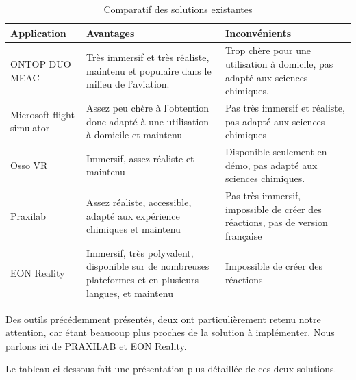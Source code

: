 \begin{table}[H]
	\centering
	\caption{Comparatif des solutions existantes}
	\begin{tabular}{|l|p{5cm}|p{5cm}|}
		\hline
		\textbf{Application}       & \textbf{Avantages}                                                                                       & \textbf{Inconvénients}                                                         \\ \hline
		ONTOP DUO MEAC             & Très immersif et très réaliste, maintenu et populaire dans le milieu de l'aviation.                      & Trop chère pour une utilisation à domicile, pas adapté aux sciences chimiques. \\ \hline
		Microsoft flight simulator & Assez peu chère à l'obtention donc adapté à une utilisation à domicile et maintenu                       & Pas très immersif et réaliste, pas adapté aux sciences chimiques               \\ \hline
		Osso VR                    & Immersif, assez réaliste et maintenu                                                                     & Disponible seulement en démo, pas adapté aux sciences chimiques.               \\ \hline
		Praxilab                   & Assez réaliste, accessible, adapté aux expérience chimiques et maintenu                                  & Pas très immersif, impossible de créer des réactions, pas de version française \\ \hline
		EON Reality                & Immersif, très polyvalent, disponible sur de nombreuses plateformes et en plusieurs langues, et maintenu & Impossible de créer des réactions                                              \\ \hline
	\end{tabular}
\end{table}

Des outils précédemment présentés, deux ont particulièrement retenu notre attention, car étant beaucoup plus proches de la solution à implémenter. Nous parlons ici de PRAXILAB et EON Reality.

Le tableau ci-dessous fait une présentation plus détaillée de ces deux solutions.

